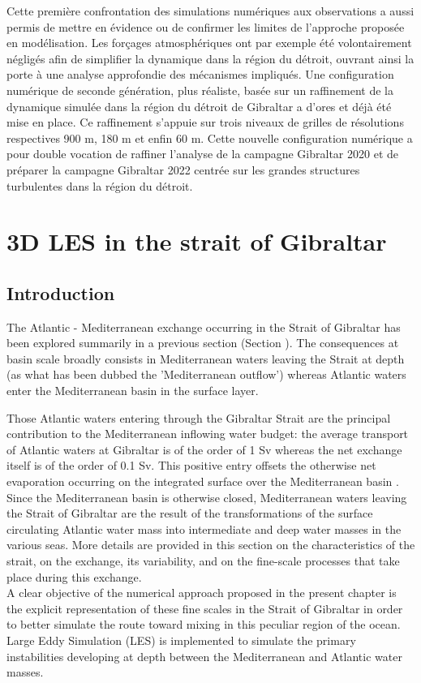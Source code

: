 Cette première confrontation des simulations numériques aux observations a aussi permis de mettre en évidence ou de confirmer les limites de l'approche proposée en modélisation. Les forçages atmosphériques ont par exemple été volontairement négligés afin de simplifier la dynamique dans la région du détroit, ouvrant ainsi la porte à une analyse approfondie des mécanismes impliqués. Une configuration numérique de seconde génération, plus réaliste, basée sur un raffinement de la dynamique simulée dans la région du détroit de Gibraltar a d'ores et déjà été mise en place. Ce raffinement s'appuie sur trois niveaux de grilles de résolutions respectives 900 m, 180 m et enfin 60 m. Cette nouvelle configuration numérique a pour double vocation de raffiner l'analyse de la campagne Gibraltar 2020 et de préparer la campagne Gibraltar 2022 centrée sur les grandes structures turbulentes dans la région du détroit.


\section{3D LES in the strait of Gibraltar}
\label{sectionSim3D}
\subsection{Introduction}
\label{IntroSim3D}

The Atlantic - Mediterranean exchange occurring in the Strait of Gibraltar has been explored summarily in a previous section (Section ). The consequences at basin scale broadly consists in Mediterranean waters leaving the Strait at depth (as what has been dubbed the 'Mediterranean outflow') whereas Atlantic waters enter the Mediterranean basin in the surface layer.

Those Atlantic waters entering through the Gibraltar Strait are the principal contribution to the Mediterranean inflowing water budget: the average transport of Atlantic waters at Gibraltar is of the order of 1 Sv whereas the net exchange itself is of the order of 0.1 Sv. This positive entry offsets the otherwise net evaporation occurring on the integrated surface over the Mediterranean basin \citep{Bryden94}.
Since the Mediterranean basin is otherwise closed, Mediterranean waters leaving the Strait of Gibraltar are the result of the transformations of the surface circulating Atlantic water mass into intermediate and deep water masses in the various seas.
More details are provided in this section on the characteristics of the strait, on the exchange, its variability, and on the fine-scale processes that take place during this exchange.\\
A clear objective of the numerical approach proposed in the present chapter is the explicit representation of these fine scales in the Strait of Gibraltar in order to better simulate the route toward mixing in this peculiar region of the ocean. Large Eddy Simulation (LES) is implemented to simulate the primary instabilities developing at depth between the Mediterranean and Atlantic water masses.

